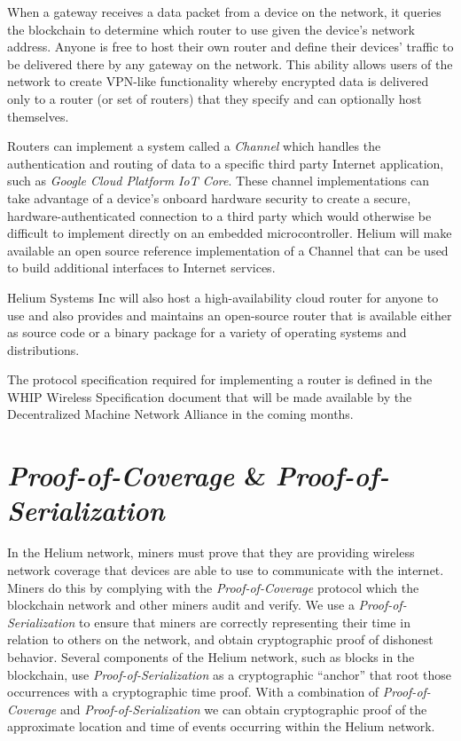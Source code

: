 \documentclass[10pt, nonatbib, nocopyrightspace, reprint]{sigplanconf}
\begin{document}
When a gateway receives a data packet from a device on the network, it queries the blockchain to determine which router to use given the device's network address. Anyone is free to host their own router and define their devices' traffic to be delivered there by any gateway on the network. This ability allows users of the network to create VPN-like functionality whereby encrypted data is delivered only to a router (or set of routers) that they specify and can optionally host themselves.

Routers can implement a system called a \emph{Channel} which handles the authentication and routing of data to a specific third party Internet application, such as \emph{Google Cloud Platform IoT Core}. These channel implementations can take advantage of a device's onboard hardware security to create a secure, hardware-authenticated connection to a third party which would otherwise be difficult to implement directly on an embedded microcontroller. Helium will make available an open source reference implementation of a Channel that can be used to build additional interfaces to Internet services.

Helium Systems Inc will also host a high-availability cloud router for anyone to use and also provides and maintains an open-source router that is available either as source code or a binary package for a variety of operating systems and distributions.

The protocol specification required for implementing a router is defined in the WHIP Wireless Specification document that will be made available by the Decentralized Machine Network Alliance in the coming months.

\section{\emph{Proof-of-Coverage} \& \emph{Proof-of-Serialization}}\label{poc}

In the Helium network, miners must prove that they are providing wireless network coverage that devices are able to use to communicate with the internet. Miners do this by complying with the \emph{Proof-of-Coverage} protocol which the blockchain network and other miners audit and verify. We use a \emph{Proof-of-Serialization} to ensure that miners are correctly representing their time in relation to others on the network, and obtain cryptographic proof of dishonest behavior. Several components of the Helium network, such as blocks in the blockchain, use \emph{Proof-of-Serialization} as a cryptographic ``anchor'' that root those occurrences  with a cryptographic time proof. With a combination of \emph{Proof-of-Coverage} and \emph{Proof-of-Serialization} we can obtain cryptographic proof of the approximate location and time of events occurring within the Helium network.
\end{document}
